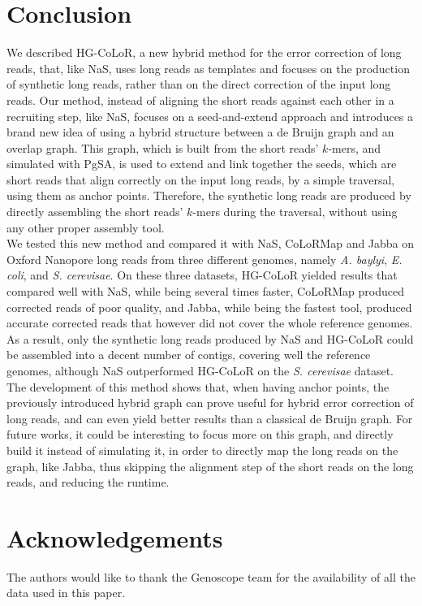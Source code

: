 \documentclass[long, final]{jobim2017}
\begin{document}
\section{Conclusion}
\label{sec:conclusion}

We described HG-CoLoR, a new hybrid method for the error correction of long reads, that, like NaS, uses long reads as templates and focuses on the production of synthetic long reads, rather than on the direct correction of the input long reads. Our method, instead of aligning the short reads against each other in a recruiting step, like NaS, focuses on a seed-and-extend approach and introduces a brand new idea of using a hybrid structure between a de Bruijn graph and an overlap graph. This graph, which is built from the short reads' $k$-mers, and simulated with PgSA, is used to extend and link together the seeds, which are short reads that align correctly on the input long reads, by a simple traversal, using them as anchor points. Therefore, the synthetic long reads are produced by directly assembling the short reads' $k$-mers during the traversal, without using any other proper assembly tool. \\
\indent We tested this new method and compared it with NaS, CoLoRMap and Jabba on Oxford Nanopore long reads from three different genomes, namely \emph{A. baylyi}, \emph{E. coli}, and \emph{S. cerevisae}. On these three datasets, HG-CoLoR yielded results that compared well with NaS, while being several times faster, CoLoRMap produced corrected reads of poor quality, and Jabba, while being the fastest tool, produced accurate corrected reads that however did not cover the whole reference genomes. As a result, only the synthetic long reads produced by NaS and HG-CoLoR could be assembled into a decent number of contigs, covering well the reference genomes, although NaS outperformed HG-CoLoR on the \emph{S. cerevisae} dataset. \\
\indent The development of this method shows that, when having anchor points, the previously introduced hybrid graph can prove useful for hybrid error correction of long reads, and can even yield better results than a classical de Bruijn graph. For future works, it could be interesting to focus more on this graph, and directly build it instead of simulating it, in order to directly map the long reads on the graph, like Jabba, thus skipping the alignment step of the short reads on the long reads, and reducing the runtime.

\section*{Acknowledgements}

The authors would like to thank the Genoscope team for the availability of all the data used in this paper.


\end{document}
